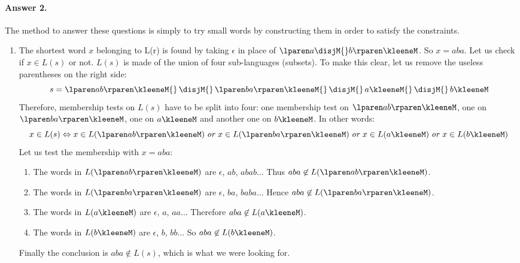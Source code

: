 \paragraph{Answer 2.} The method to answer these questions is simply
to try small words by constructing them in order to satisfy the
constraints.
\begin{enumerate}

  \item The \label{aba} shortest word \(x\) belonging to L(r) is found
    by taking \(\epsilon\) in place of \(\lparen a \disjM{}
    b\rparen\kleeneM\). So \(x = aba\). Let us check if \(x \in L(s)\)
    or not. \(L(s)\) is made of the union of four sub-languages
    (subsets). To make this clear, let us remove the useless
    parentheses on the right side:
    \[
    s = \lparen ab \rparen\kleeneM{} \, \disjM{} \, \lparen ba
    \rparen\kleeneM{} \, \disjM{} \, a\kleeneM{} \, \disjM{} \,
    b\kleeneM
    \]
    Therefore, membership tests on \(L(s)\) have to be split
    into four: one membership test on \(\lparen ab
    \rparen\kleeneM\), one on \(\lparen ba \rparen\kleeneM\),
    one on \(a\kleeneM\) and another one on
    \(b\kleeneM\). In other words:
    \[
     x \in L(s) \Leftrightarrow x \in L(\lparen ab \rparen\kleeneM) \;
     \text{\emph{or}} \; x \in L(\lparen ba \rparen\kleeneM) \;
     \text{\emph{or}} \; x \in L(a\kleeneM) \; \text{\emph{or}} \; x
     \in L(b\kleeneM)
    \]
    Let us test the membership with \(x = aba\):
    \begin{enumerate}
  
      \item The words in \(L(\lparen ab \rparen\kleeneM)\) are
        \(\epsilon\), \(ab\), \(abab\ldots\) Thus \(aba \not\in
        L(\lparen ab \rparen\kleeneM)\).

      \item The words in \(L(\lparen ba \rparen\kleeneM)\) are
        \(\epsilon\), \(ba\), \(baba\ldots\) Hence \(aba \not\in
        L(\lparen ba \rparen\kleeneM)\).

      \item The words in \(L(a\kleeneM)\) are \(\epsilon\), \(a\),
        \(aa\ldots\) Therefore \(aba \not\in L(a\kleeneM)\).

      \item The words in \(L(b\kleeneM)\) are \(\epsilon\), \(b\),
        \(bb\ldots\) So \(aba \not\in L(b\kleeneM)\).
  
    \end{enumerate}
    Finally the conclusion is \(aba \not\in L(s)\), which is what we
    were looking for.


\end{enumerate}
